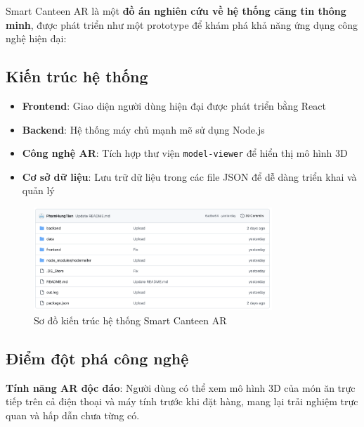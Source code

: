 \documentclass[12pt,a4paper]{article}
\begin{document}
Smart Canteen AR là một \textbf{đồ án nghiên cứu về hệ thống căng tin thông minh}, được phát triển như một prototype để khám phá khả năng ứng dụng công nghệ hiện đại:

\subsection{Kiến trúc hệ thống}
\begin{itemize}[leftmargin=1cm]
    \item \textbf{Frontend}: Giao diện người dùng hiện đại được phát triển bằng React
    \item \textbf{Backend}: Hệ thống máy chủ mạnh mẽ sử dụng Node.js
    \item \textbf{Công nghệ AR}: Tích hợp thư viện \texttt{model-viewer} để hiển thị mô hình 3D
    \item \textbf{Cơ sở dữ liệu}: Lưu trữ dữ liệu trong các file JSON để dễ dàng triển khai và quản lý
\end{itemize}

\begin{figure}[H]
    \centering
    \includegraphics[width=0.8\textwidth]{../images/kien_truc_he_thong.png} %
    \caption{Sơ đồ kiến trúc hệ thống Smart Canteen AR}
    \label{fig:kien_truc_he_thong}
\end{figure}

\subsection{Điểm đột phá công nghệ}
\textbf{Tính năng AR độc đáo}: Người dùng có thể xem mô hình 3D của món ăn trực tiếp trên cả điện thoại và máy tính trước khi đặt hàng, mang lại trải nghiệm trực quan và hấp dẫn chưa từng có.
\end{document}

